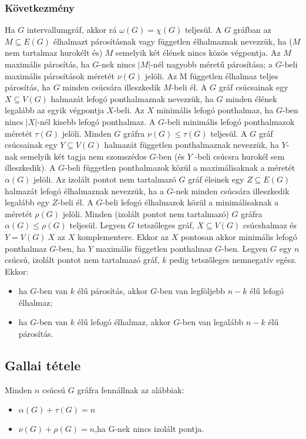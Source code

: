 \documentclass[12pt,a4paper,twoside]{report}
\begin{document}
\subsubsection{Következmény}
 Ha $G$ intervallumgráf, akkor rá $\omega(G) = \chi(G)$ teljesül.
\df 
 A $G$ gráfban az $M\subseteq E(G)$ élhalmazt párosításnak vagy független
élhalmaznak nevezzük, ha ($M$ nem tartalmaz hurokélt és) $M$ semelyik két élének
nincs közös végpontja. Az $M$ maximális párosítás, ha $G$-nek nincs $|M|$-nél nagyobb
méretű párosítása; a $G$-beli maximális párosítások méretét $\nu(G)$ jelöli. Az M független élhalmaz teljes párosítás, ha $G$ minden csúcsára illeszkedik $M$-beli él.
\df 
A $G$ gráf csúcsainak egy $X\subseteq V(G)$ halmazát lefogó ponthalmaznak nevezzük, ha $G$ minden élének legalább az egyik végpontja $X$-beli. Az $X$ minimális lefogó ponthalmaz, ha $G$-ben nincs $|X|$-nél kisebb lefogó ponthalmaz. A $G$-beli minimális lefogó ponthalmazok méretét $\tau(G)$ jelöli.
\al 
Minden $G$ gráfra $\nu(G)\leq\tau(G)$ teljesül.
\df 
 A $G$ gráf csúcsainak egy $Y\subseteq V(G)$ halmazát független ponthalmaznak nevezzük, ha $Y$-nak semelyik két tagja nem szomszédos $G$-ben (és $Y$ -beli csúcsra hurokél sem illeszkedik). A $G$-beli független ponthalmazok közül a maximálisaknak a méretét $\alpha(G)$ jelöli.
\df 
 Az izolált pontot nem tartalmazó $G$ gráf éleinek egy $Z\subseteq E(G)$
halmazát lefogó élhalmaznak nevezzük, ha a $G$-nek minden csúcsára illeszkedik
legalább egy $Z$-beli él. A $G$-beli lefogó élhalmazok közül a minimálisaknak a méretét $\rho(G)$ jelöli.
\al 
Minden (izolált pontot nem tartalmazó) $G$ gráfra $\alpha(G)\leq\rho(G)$ teljesül.
\al
Legyen $G$ tetszőleges gráf, $X\subseteq V(G)$ csúcshalmaz és $Y = V (G) \ X$
az $X$ komplementere. Ekkor az $X$ pontosan akkor minimális lefogó ponthalmaz
$G$-ben, ha $Y$ maximális független ponthalmaz $G$-ben.
\al 
 Legyen $G$ egy $n$ csúcsú, izolált pontot nem tartalmazó gráf, $k$ pedig tetszőleges nemnegatív egész. Ekkor:
 \begin{itemize}
 	\item ha $G$-ben van $k$ élű párosítás, akkor $G$-ben van legföljebb $n-k$ élű lefogó élhalmaz;
 	\item  ha $G$-ben van $k$ élű lefogó élhalmaz, akkor $G$-ben van legalább $n-k$ élű
 	párosítás.
 \end{itemize}
\subsection{Gallai tétele}
Minden $n$ csúcsú $G$ gráfra fennállnak az alábbiak:
\begin{itemize}
	\item $\alpha(G)+\tau(G) =n$
	\item $\nu(G)+\rho(G)=n$,ha G-nek nincs izolált pontja.
\end{itemize}
\end{document}
